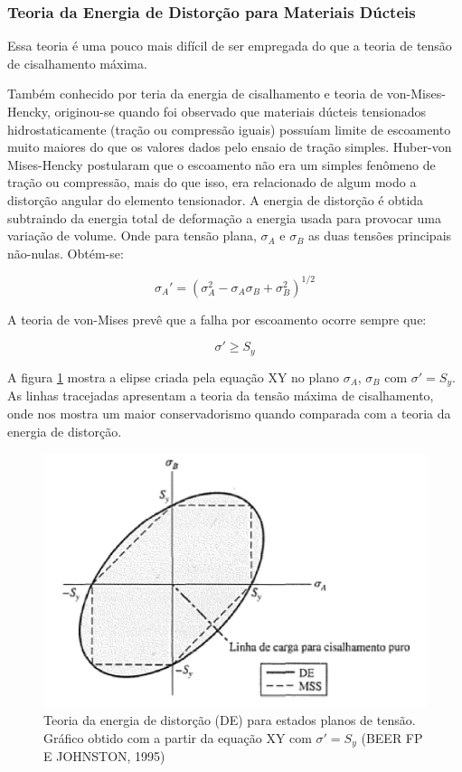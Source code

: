\subsubsection{Teoria da Energia de Distorção para Materiais Dúcteis}

Essa teoria é uma pouco mais difícil de ser empregada do que a teoria de tensão de cisalhamento máxima.

Também conhecido por teria da energia de cisalhamento e teoria de von-Mises-Hencky, originou-se quando foi observado que materiais dúcteis tensionados hidrostaticamente (tração ou compressão iguais) possuíam limite de escoamento muito maiores do que os valores dados pelo ensaio de tração simples. Huber-von Mises-Hencky postularam que o escoamento  não era um simples fenômeno de tração ou compressão, mais do que isso, era relacionado de algum modo a distorção angular do elemento tensionador.
A energia de distorção é obtida subtraindo da energia total de deformação a energia usada para provocar uma variação de volume. Onde para tensão plana, $\sigma_{A}$ e $\sigma_{B}$ as duas tensões principais não-nulas. Obtém-se:

\begin{equation}
{\sigma_{A}}' = \left ( \sigma^{2}_{A} - \sigma_{A}\sigma_{B}+\sigma^{2}_{B}\right )^{1/2} 
\end{equation}

A teoria de von-Mises prevê que a falha por escoamento ocorre sempre que:

\begin{equation}
{\sigma}' \geq S_{y}
\end{equation}

A figura \ref{energia-distorcao} mostra a elipse criada pela equação XY no plano $\sigma_{A}$, $\sigma_{B}$ com ${\sigma}' = S_{y}$. As linhas tracejadas apresentam a teoria da tensão máxima de cisalhamento, onde nos mostra um maior conservadorismo quando comparada com a teoria da energia de distorção.

\begin{figure}[h]
\centering
\includegraphics[scale=0.7]{figuras/teoria_distorc.png}
\caption{Teoria da energia de distorção (DE) para estados planos de tensão. Gráfico obtido com a partir da equação XY com  ${\sigma}' = S_{y}$ (BEER FP E JOHNSTON, 1995)}
\label{energia-distorcao}
\end{figure}


